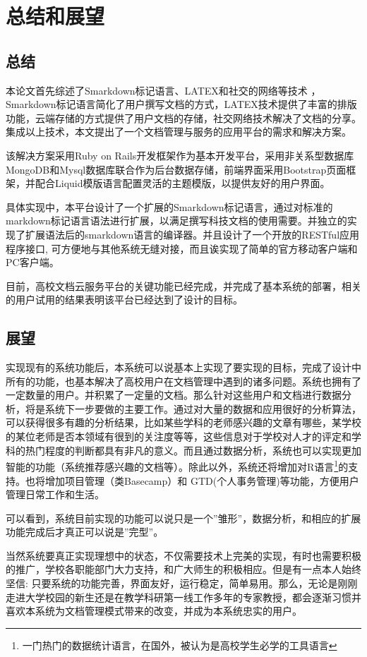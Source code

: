 
\chapter{总结和展望}
\label{chap:sumandprospect}

\section{总结}
\label{sec:zongjie}

本论文首先综述了Smarkdown标记语言、LATEX和社交的网络等技术 ，Smarkdown标记语言简化了用户撰写文档的方式，LATEX技术提供了丰富的排版功能，云端存储的方式提供了用户文档的存储，社交网络技术解决了文档的分享。集成以上技术，本文提出了一个文档管理与服务的应用平台的需求和解决方案。

该解决方案采用Ruby on Rails开发框架作为基本开发平台，采用非关系型数据库MongoDB和Mysql数据库联合作为后台数据存储，前端界面采用Bootstrap页面框架，并配合Liquid模版语言配置灵活的主题模版，以提供友好的用户界面。

具体实现中，本平台设计了一个扩展的Smarkdown标记语言，通过对标准的markdown标记语言语法进行扩展，以满足撰写科技文档的使用需要。并独立的实现了扩展语法后的smarkdown语言的编译器。并且设计了一个开放的RESTful应用程序接口, 可方便地与其他系统无缝对接，而且诶实现了简单的官方移动客户端和PC客户端。

目前，高校文档云服务平台的关键功能已经完成，并完成了基本系统的部署，相关的用户试用的结果表明该平台已经达到了设计的目标。

\section{展望}
\label{sec:zhanwang}

实现现有的系统功能后，本系统可以说基本上实现了要实现的目标，完成了设计中所有的功能，也基本解决了高校用户在文档管理中遇到的诸多问题。系统也拥有了一定数量的用户。并积累了一定量的文档。那么针对这些用户和文档进行数据分析，将是系统下一步要做的主要工作。通过对大量的数据和应用很好的分析算法，可以获得很多有趣的分析结果，比如某些学科的老师感兴趣的文章有哪些，某学校的某位老师是否本领域有很到的关注度等等，这些信息对于学校对人才的评定和学科的热门程度的判断都具有非凡的意义。而且通过数据分析，系统也可以实现更加智能的功能（系统推荐感兴趣的文档等）。除此以外，系统还将增加对R语言\footnote{一门热门的数据统计语言，在国外，被认为是高校学生必学的工具语言}的支持。也将增加项目管理（类Basecamp）和 GTD(个人事务管理)等功能，方便用户管理日常工作和生活。

可以看到，系统目前实现的功能可以说只是一个''雏形''，数据分析，和相应的扩展功能完成后才真正可以说是''完型''。

当然系统要真正实现理想中的状态，不仅需要技术上完美的实现，有时也需要积极的推广，学校各职能部门大力支持，和广大师生的积极相应。但是有一点本人始终坚信: 只要系统的功能完善，界面友好，运行稳定，简单易用。那么，无论是刚刚走进大学校园的新生还是在教学科研第一线工作多年的专家教授，都会逐渐习惯并喜欢本系统为文档管理模式带来的改变，并成为本系统忠实的用户。
